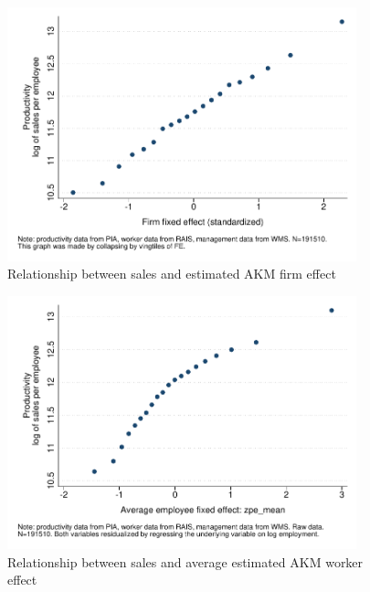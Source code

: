 \clearpage
\begin{figure}
    \includegraphics[width=0.9\textwidth]{./exhibits/cvb_fig7a_sa}
    \caption{Relationship between sales and estimated AKM firm effect}
    \label{fig:sales_v_fe}
\end{figure}

\clearpage
\begin{figure}
    \includegraphics[width=0.9\textwidth]{./exhibits/cvb_f6_zpe_mean_sa}
    \caption{Relationship between sales and average estimated AKM worker effect}
    \label{fig:sales_v_pe}
\end{figure}

